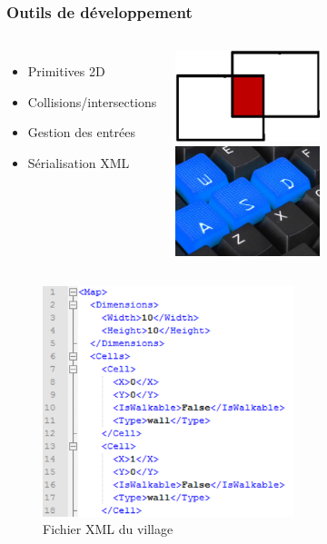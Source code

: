 \documentclass{beamer}
\begin{document}
\begin{frame}
\frametitle{Outils de développement}
\begin{columns}
\begin{itemize}
	\item Primitives 2D
	\item Collisions/intersections
	\item Gestion des entrées
	\item Sérialisation XML
\end{itemize}
\begin{center}
\includegraphics[width=0.5\textwidth]{img/pres_prim2d.png}\\
\includegraphics[width=0.5\textwidth]{img/pres_keys.jpg}\\
\end{center}
\end{columns}
\end{frame}

\begin{frame}
\begin{center}
\begin{figure}
\includegraphics[width=0.65\textwidth]{img/pres_xml.png}
\caption{Fichier XML du village}
\end{figure}
\end{center}
\end{frame}
\end{document}
